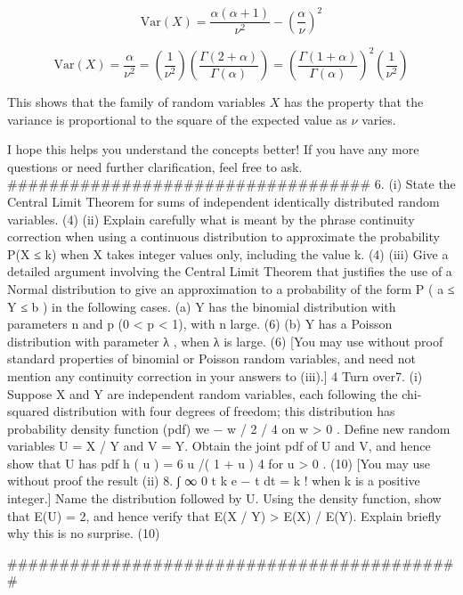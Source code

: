 \[ \text{Var}(X) = \frac{\alpha(\alpha+1)}{\nu^2} - \left(\frac{\alpha}{\nu}\right)^2 \]

\[ \text{Var}(X) = \frac{\alpha}{\nu^2} = \left(\frac{1}{\nu^2}\right)\left(\frac{\Gamma(2 + \alpha)}{\Gamma(\alpha)}\right) = \left(\frac{\Gamma(1 + \alpha)}{\Gamma(\alpha)}\right)^2 \left(\frac{1}{\nu^2}\right) \]

This shows that the family of random variables \( X \) has the property that the variance is proportional to the square of the expected value as \( \nu \) varies.

I hope this helps you understand the concepts better! If you have any more questions or need further clarification, feel free to ask.
###################################
6.
(i) State the Central Limit Theorem for sums of independent identically
distributed random variables.
(4)
(ii) Explain carefully what is meant by the phrase continuity correction when
using a continuous distribution to approximate the probability P(X ≤ k) when X
takes integer values only, including the value k.
(4)
(iii) Give a detailed argument involving the Central Limit Theorem that justifies
the use of a Normal distribution to give an approximation to a probability of
the form P ( a ≤ Y ≤ b ) in the following cases.
(a) Y has the binomial distribution with parameters n and p (0 < p < 1),
with n large.
(6)
(b) Y has a Poisson distribution with parameter λ , when λ is large.
(6)
[You may use without proof standard properties of binomial or Poisson random
variables, and need not mention any continuity correction in your answers to (iii).]
4
Turn over7.
(i)
Suppose X and Y are independent random variables, each following the chi-
squared distribution with four degrees of freedom; this distribution has
probability density function (pdf) we − w / 2 / 4 on w > 0 .
Define new random variables U = X / Y and V = Y. Obtain the joint pdf of U
and V, and hence show that U has pdf h ( u ) = 6 u /( 1 + u ) 4 for u > 0 .
(10)
[You may use without proof the result
(ii)
8.
∫
∞
0
t k e − t dt = k ! when k is a positive integer.]
Name the distribution followed by U. Using the density function, show that
E(U) = 2, and hence verify that E(X / Y) > E(X) / E(Y). Explain briefly why this
is no surprise.
(10)

############################################

